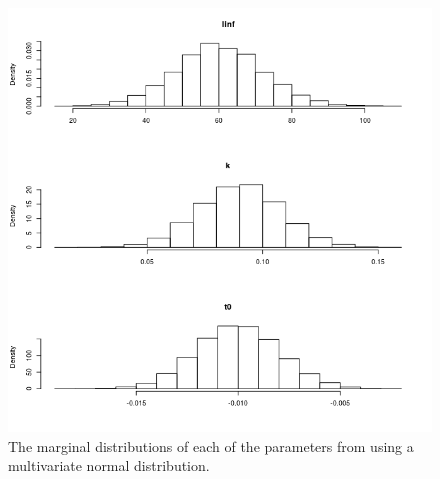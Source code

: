 \documentclass[a4paper,english,10pt]{article}\usepackage[]{graphicx}\usepackage[]{color}
\newenvironment{knitrout}{}{} %
\begin{document}
\begin{knitrout}
\color{fgcolor}\begin{figure}[H]

{\centering \includegraphics[width=.9\linewidth]{figure/plot_norm_params-1} 

}

\caption[The marginal distributions of each of the parameters from using a multivariate normal distribution]{The marginal distributions of each of the parameters from using a multivariate normal distribution.}\label{fig:plot_norm_params}
\end{figure}


\end{knitrout}
\end{document}
